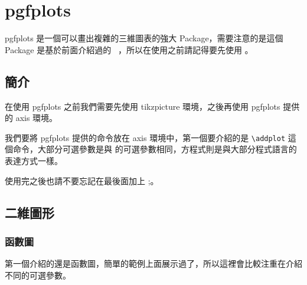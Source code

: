 \chapter{pgfplots}

pgfplots 是一個可以畫出複雜的三維圖表的強大 Package，需要注意的是這個 Package 是基於前面介紹過的 \TikZ\ ，所以在使用之前請記得要先使用 \TikZ 。

\section{簡介}

在使用 pgfplots 之前我們需要先使用 tikzpicture 環境，之後再使用 pgfplots  提供的 axis 環境。

\begin{tcblisting}{}
\end{tcblisting}

我們要將 pgfplots 提供的命令放在 axis 環境中，第一個要介紹的是  \verb`\addplot` 這個命令，大部分可選參數是與 \TikZ 的可選參數相同，方程式則是與大部分程式語言的表達方式一樣。

\begin{tcblisting}{}
\end{tcblisting}

使用完之後也請不要忘記在最後面加上 ;。

\section{二維圖形}

\subsection{函數圖}

第一個介紹的還是函數圖，簡單的範例上面展示過了，所以這裡會比較注重在介紹不同的可選參數。

\begin{tcblisting}{}
\end{tcblisting}

